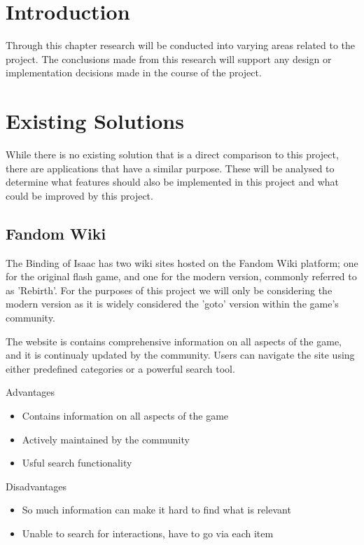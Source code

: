 \section{Introduction}
Through this chapter research will be conducted into varying areas related to the project. The conclusions made from 
this research will support any design or implementation decisions made in the course of the project.
\section{Existing Solutions}
While there is no existing solution that is a direct comparison to this project, there are applications that have a 
similar purpose. These will be analysed to determine what features should also be implemented in this project and what 
could be improved by this project.
\subsection*{Fandom Wiki}
The Binding of Isaac has two wiki sites hosted on the Fandom Wiki platform; one for the original flash 
game\cite{BindingIsaacWiki}, and one for the modern version, commonly referred to as 'Rebirth'\cite{BindingIsaacRebirth}.
For the purposes of this project we will only be considering the modern version as it is widely considered the 'goto' 
version within the game's community.\par The website is contains comprehensive information on all aspects of the game, 
and it is continualy updated by the community. Users can navigate the site using either predefined categories or a 
powerful search tool. \par
Advantages
\begin{itemize}
    \item Contains information on all aspects of the game
    \item Actively maintained by the community
    \item Usful search functionality
\end{itemize}
Disadvantages
\begin{itemize}
    \item So much information can make it hard to find what is relevant
    \item Unable to search for interactions, have to go via each item 
\end{itemize}
